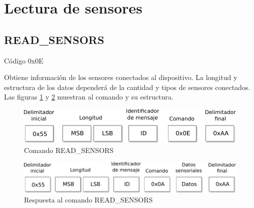 \section{Lectura de sensores}

\subsection{READ\_SENSORS}

Código 0x0E

Obtiene información de los sensores conectados al dispositivo. La longitud y estructura de los datos dependerá de la cantidad y tipos de sensores conectados. Las figuras \ref{fig:cmd_read_sensors} y \ref{fig:res_read_sensors} muestran al comando y su estructura. 

\begin{figure}
	\centering
	\includegraphics[scale=0.7]{capitulo_3_imgs/cmd_read_sensors.pdf}
	\caption{Comando READ\_SENSORS}
	\label{fig:cmd_read_sensors}
\end{figure}

\begin{figure}
	\centering
	\includegraphics[scale=0.7]{capitulo_3_imgs/res_read_sensors.pdf}
	\caption{Respuesta al comando READ\_SENSORS}
	\label{fig:res_read_sensors}
\end{figure}
